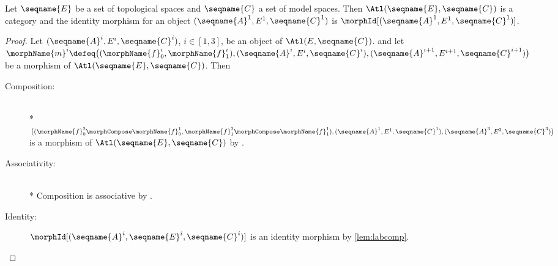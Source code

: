 \documentclass{article}
\begin{document}
\begin{lemma}
\label{lem:T-ATLiscat}
Let $\seqname{E}$ be a set of topological spaces and $\seqname{C}$ a
set of model spaces. Then $\Atl(\seqname{E}, \seqname{C})$ is a category
and the identity morphism for an object
$(\seqname{A}^1, E^1, \seqname{C}^1)$ is
$\morphId[{{(\seqname{A}^1, E^1, \seqname{C}^1)}}]$.

\begin{proof}
Let $(\seqname{A}^i,E^i,\seqname{C}^i)$, $i \in [1,3]$,
be an object of $\Atl(E, \seqname{C})$. and let
$
  \morphName{m}^i \defeq \\
  \bigl (
    (\morphName{f}_0^i,\morphName{f}_1^i),
    (\seqname{A}^i,E^i,\seqname{C}^i),
    (\seqname{A}^{i+1},E^{i+1},\seqname{C}^{i+1})
  \bigr )
$
be a morphism of $\Atl(\seqname{E}, \seqname{C})$. Then
\begin{description}
\item[Composition:]
\leavevmode \\*
$
  \bigl (
    (
      \morphName{f}_0^2 \morphCompose \morphName{f}_0^1,
      \morphName{f}_1^2 \morphCompose \morphName{f}_1^1
    ),
    (\seqname{A}^1,E^1,\seqname{C}^1),
    (\seqname{A}^3,E^3,\seqname{C}^3)
  \bigr )
$
is a morphism of $\Atl(\seqname{E}, \seqname{C})$ by
.

\item[Associativity:]
\leavevmode \\*
Composition is associative by .

\item[Identity:]
$\morphId[{{(\seqname{A}^i, \seqname{E}^i, \seqname{C}^i)}}]$ is an identity
morphism by \cref{lem:labcomp}.
\end{description}
\end{proof}


\end{lemma}
\end{document}
